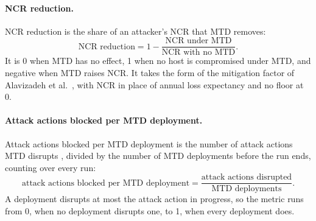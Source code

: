 \documentclass{cshonours}
\begin{document}
\paragraph{NCR reduction.}
NCR reduction is the share of an attacker's NCR that MTD removes:
\begin{equation}
  \text{NCR reduction} = 1 -
  \frac{\text{NCR under MTD}}{\text{NCR with no MTD}}.
  \label{eq:ncr-reduction}
\end{equation}
It is 0 when MTD has no effect, 1 when no host is compromised under MTD, and
negative when MTD raises NCR. It takes the form of the mitigation factor of
Alavizadeh et al.\ \citep[eq.~(13)]{alavizadeh2022}, with NCR in place of annual
loss expectancy and no floor at 0.

\paragraph{Attack actions blocked per MTD deployment.}
Attack actions blocked per MTD deployment is the number of attack actions MTD
disrupts \citep{brown2023}, divided by the number of MTD deployments before
the run ends, counting over every run:
\begin{equation}
  \text{attack actions blocked per MTD deployment} =
  \frac{\text{attack actions disrupted}}{\text{MTD deployments}}.
  \label{eq:blocked}
\end{equation}
A deployment disrupts at most the attack action in progress, so the metric runs
from 0, when no deployment disrupts one, to 1, when every deployment does.
\end{document}
